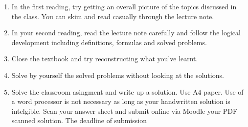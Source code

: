 \documentclass[10pt,a4j]{article}
\begin{document}
\begin{enumerate}
\item
In the first reading, try getting an overall picture of the topics discussed in the class.
You can skim and read casually through the lecture note.
\item
In your second reading, read the lecture note carefully and follow the logical 
	development including definitions, formulas and solved problems.
\item
Close the textbook and try reconstructing what you've learnt.
\item
Solve by yourself the solved problems without looking at the solutions.
\item
Solve the classroom asingment and write up a solution. 
Use A4 paper. Use of a word processor is not necessary as long as your 
handwritten solution is intelgible. 
Scan your answer sheet and submit online via Moodle your PDF scanned solution.
The deadline of submission 
\end{enumerate}
\end{document}
